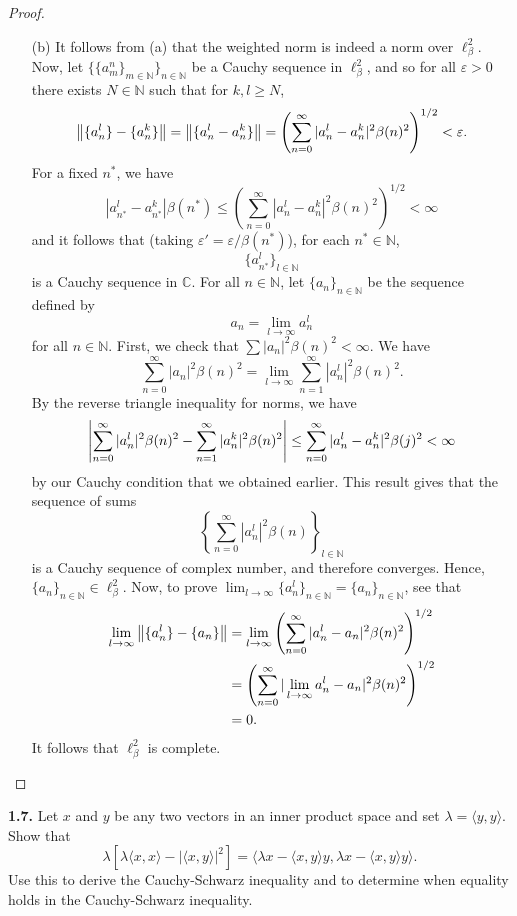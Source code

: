 \documentclass[12pt]{article}
\theoremstyle{definition}
\begin{document}
\begin{proof}
\begin{itemize}
			\item[(b)] It follows from (a) that the weighted norm is indeed a norm over $\ell_\beta^2$. Now, let $\{\{a_m^n\}_{m \in \mathbb{N}}\}_{n \in \mathbb{N}}$ be a Cauchy sequence in $\ell_\beta^2$, and so for all $\varepsilon > 0$ there exists $N \in \mathbb{N}$ such that for $k, l \geq N$, $$\norm{\{a_n^l\} - \{a_n^k\}} = \norm{\{a_n^l - a_n^k\}} = \left(\sum_{n = 0}^\infty |a_n^l - a_n^k|^2 \beta(n)^2\right)^{1/2} < \varepsilon.$$ For a fixed $n^\ast$, we have $$|a_{n^\ast}^l - a_{n^\ast}^k|\beta(n^\ast) \leq \left(\sum_{n = 0}^\infty |a_n^l - a_n^k|^2 \beta(n)^2\right)^{1/2} < \infty$$ and it follows that (taking $\varepsilon' = \varepsilon/\beta(n^\ast)$), for each $n^\ast \in \mathbb{N}$, $$\{a_{n^\ast}^l\}_{l \in \mathbb{N}}$$ is a Cauchy sequence in $\mathbb{C}$. For all $n \in \mathbb{N}$, let $\{a_n\}_{n \in \mathbb{N}}$ be the sequence defined by $$a_n = \lim_{l \to \infty} a_n^l$$ for all $n \in \mathbb{N}$. First, we check that $\sum |a_n|^2 \beta(n)^2 < \infty$. We have $$\sum_{n = 0}^\infty |a_n|^2 \beta(n)^2 = \lim_{l \to \infty} \sum_{n = 1}^\infty |a_n^l|^2 \beta(n)^2.$$ By the reverse triangle inequality for norms, we have $$\abs{\sum_{n = 0}^\infty |a_n^l|^2\beta(n)^2 - \sum_{n = 1}^\infty |a_n^k|^2\beta(n)^2} \leq \sum_{n = 0}^\infty |a_n^l - a_n^k|^2 \beta(j)^2 < \infty$$ by our Cauchy condition that we obtained earlier. This result gives that the sequence of sums $$\left\{\sum_{n  = 0}^\infty |a_n^l|^2 \beta(n)\right\}_{l \in \mathbb{N}}$$ is a Cauchy sequence of complex number, and therefore converges. Hence, $\{a_n\}_{n \in \mathbb{N}} \in \ell_\beta^2$. Now, to prove $\lim_{l \to \infty} \{a_n^l\}_{n \in \mathbb{N}} = \{a_n\}_{n \in \mathbb{N}}$, see that
				\begin{align*}
					\lim_{l \to \infty} \norm{\{a_n^l\} - \{a_n\}} &= \lim_{l \to \infty}\left(\sum_{n = 0}^\infty|a_n^l - a_n|^2 \beta(n)^2\right)^{1/2} \\
					&= \left(\sum_{n = 0}^\infty |\lim_{l \to \infty}a_n^l - a_n|^2 \beta(n)^2\right)^{1/2} \\
					&= 0. 
				\end{align*} 
			It follows that $\ell_\beta^2$ is complete. 
		\end{itemize}
	\end{proof}
	
\noindent \textbf{1.7.} Let $x$ and $y$ be any two vectors in an inner product space and set $\lambda = \langle y, y \rangle$. Show that $$\lambda [\lambda \langle x, x\rangle - |\langle x, y \rangle|^2] = \langle \lambda x - \langle x, y\rangle y, \lambda x - \langle x, y \rangle y \rangle.$$ Use this to derive the Cauchy-Schwarz inequality and to determine when equality holds in the Cauchy-Schwarz inequality. 
\end{document}
